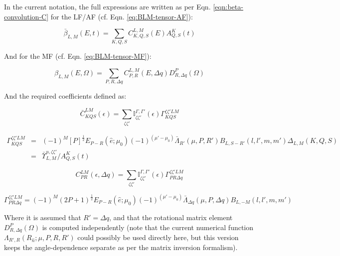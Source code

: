 \documentclass[10pt]{article}
\begin{document}
In the current notation, the full expressions are written as per Eqn. \ref{eqn:beta-convolution-C} for the LF/AF (cf. Eqn. \ref{eq:BLM-tensor-AF}):

\begin{equation}
\bar{\beta}_{L,M}(E,t)=\sum_{K,Q,S}C_{K,Q,S}^{L,M}(E)A_{Q,S}^{K}(t)
\end{equation}


And for the MF (cf. Eqn. \ref{eq:BLM-tensor-MF}):

\begin{equation}
\beta_{L,M}(E,\Omega)=\sum_{P,R,\Delta q}C_{P,R}^{L,M}(E,\Delta q)D_{R,\Delta q}^{P}(\Omega)
\end{equation}

And the required coefficients defined as:

\begin{equation}
\bar{C}_{KQS}^{LM}(\epsilon)=\sum_{\zeta\zeta'}\mathbb{I}_{\zeta\zeta'}^{\Gamma,\Gamma'}(\epsilon)\Gamma_{KQS}^{\zeta\zeta'LM}
\end{equation}

\begin{eqnarray}
\Gamma_{KQS}^{\zeta\zeta'LM} & = & (-1)^{M}[P]^{\frac{1}{2}}E_{P-R}(\hat{e};\mu_{0})(-1)^{(\mu'-\mu_{0})}\bar{\Lambda}_{R'}(\mu,P,R')B_{L,S-R'}(l,l',m,m')\Delta_{L,M}(K,Q,S)\\
 & = & \bar{\varUpsilon}_{L,M}^{u,\zeta\zeta'}/A_{Q,S}^{K}(t)
\end{eqnarray}

\begin{equation}
C_{PR}^{LM}(\epsilon,\Delta q)=\sum_{\zeta\zeta'}\mathbb{I}_{\zeta\zeta'}^{\Gamma,\Gamma'}(\epsilon)\Gamma_{PR\Delta q}^{\zeta\zeta'LM}
\end{equation}

\begin{equation}
\Gamma_{PR\Delta q}^{\zeta\zeta'LM}=(-1)^{M}(2P+1)^{\frac{1}{2}}E_{P-R}(\hat{e};\mu_{0})(-1)^{(\mu'-\mu_{0})}\bar{\Lambda}_{\Delta q}(\mu,P,\Delta q)B_{L,-M}(l,l',m,m')
\end{equation}

Where it is assumed that $R'=\Delta q$, and that the rotational matrix element $D_{R,\Delta q}^{P}(\Omega)$
is computed independently (note that the current numerical function $\Lambda_{R',R}(R_{\hat{n}};\mu,P,R,R')$
could possibly be used directly here, but this version keeps the angle-dependence
separate as per the matrix inversion formalism).
\end{document}
